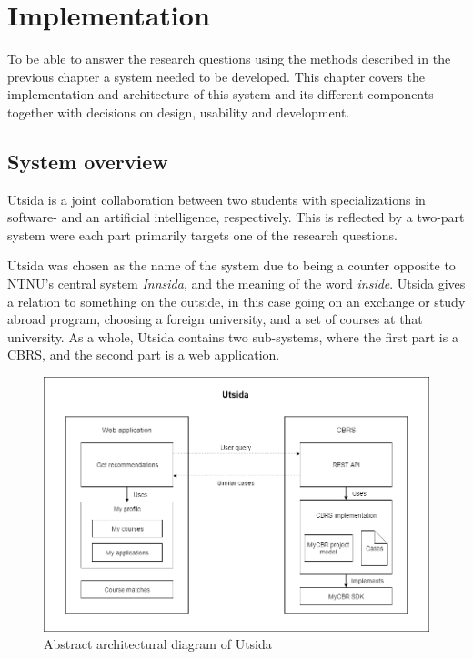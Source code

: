 
\chapter{Implementation}
To be able to answer the research questions using the methods described in the previous chapter a system needed to be developed. This chapter covers the implementation and architecture of this system and its different components together with decisions on design, usability and development. 

\section{System overview}

Utsida is a joint collaboration between two students with specializations in software- and an artificial intelligence, respectively. This is reflected by a two-part system were each part primarily targets one of the research questions.

Utsida was chosen as the name of the system due to being a counter opposite to NTNU's central system \emph{Innsida}, and the meaning of the word \emph{inside}. Utsida gives a relation to something on the outside, in this case going on an exchange or study abroad program, choosing a foreign university, and a set of courses at that university. As a whole, Utsida contains two sub-systems, where the first part is a CBRS, and the second part is a web application.

\begin{figure}[H]
    \centering
    \includegraphics[width=1\textwidth]{fig/system_overview.png}
    \caption{Abstract architectural diagram of Utsida}
    \label{fig:system_overview}
\end{figure}


